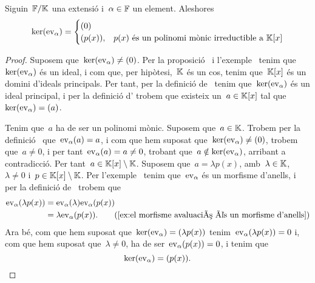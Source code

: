 \documentclass[../../main.tex]{subfiles}
\begin{document}
    \begin{lemma}
        \label{lema:element algebraic}
        \label{lema:element transcendent}
        Siguin~\(\mathbb{F}/\mathbb{K}\) una extensió i~\(\alpha\in\mathbb{F}\) un element.
        Aleshores
        \[\operatorname{ker}(\mathrm{ev}_{\alpha})=\begin{cases}
            (0) \\
            (p(x)), & p(x)\text{ és un polinomi mònic irreductible a }\mathbb{K}[x]
        \end{cases}\]
        \begin{proof} %
            Suposem que~\(\operatorname{ker}(\mathrm{ev}_{\alpha})\neq(0)\).
            Per la proposició~ i l'exemple~ tenim que~\(\operatorname{ker}(\mathrm{ev}_{\alpha})\) és un ideal, i com que, per hipòtesi,~\(\mathbb{K}\) és un cos, tenim que~\(\mathbb{K}[x]\) és un domini d'ideals principals.
            Per tant, per la definició de~ tenim que~\(\operatorname{ker}(\mathrm{ev}_{\alpha})\) és un ideal principal, i per la definició d' trobem que existeix un~\(a\in\mathbb{K}[x]\) tal que~\(\operatorname{ker}(\mathrm{ev}_{\alpha})=(a)\).

            Tenim que~\(a\) ha de ser un polinomi mònic.
            Suposem que~\(a\in\mathbb{K}\).
            Trobem per la definició~ que~\(\mathrm{ev}_{\alpha}(a)=a\), i com que hem suposat que~\(\operatorname{ker}(\mathrm{ev}_{\alpha})\neq(0)\), trobem que~\(a\neq0\), i per tant~\(\mathrm{ev}_{\alpha}(a)=a\neq0\), trobant que~\(a\notin\operatorname{ker}(\mathrm{ev}_{\alpha})\), arribant a contradicció.
            Per tant~\(a\in\mathbb{K}[x]\setminus\mathbb{K}\).
            Suposem que~\(a=\lambda p(x)\), amb~\(\lambda\in\mathbb{K}\),~\(\lambda\neq0\) i~\(p\in\mathbb{K}[x]\setminus\mathbb{K}\).
            Per l'exemple~ tenim que~\(\mathrm{ev}_{\alpha}\) és un morfisme d'anells, i per la definició de~ trobem que
            \begin{align*}
                \ev_{\alpha}(\lambda p(x))&=\ev_{\alpha}(\lambda)\ev_{\alpha}(p(x))\\
                &=\lambda\ev_{\alpha}(p(x)).
                \tag{\ref{ex:el morfisme avaluació és un morfisme d'anells}}
            \end{align*}
            Ara bé, com que hem suposat que~\(\operatorname{ker}(\mathrm{ev}_{\alpha})=(\lambda p(x))\) tenim~\(\mathrm{ev}_{\alpha}(\lambda p(x))=0\) i, com que hem suposat que~\(\lambda\neq0\), ha de ser~\(\mathrm{ev}_{\alpha}(p(x))=0\), i tenim que
            \[
                \operatorname{ker}(\mathrm{ev}_{\alpha})=(p(x)).
            \]


\end{proof}
\end{lemma}
\end{document}

